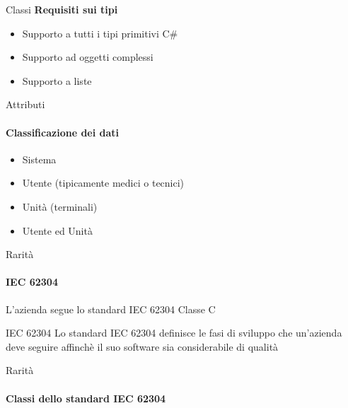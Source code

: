 \documentclass{beamer}
\begin{document}
\begin{darkframes}
\begin{frame}{Classi}
    \textbf{Requisiti sui tipi}
    \begin{itemize}
      \item Supporto a tutti i tipi primitivi C\#
      \item Supporto ad oggetti complessi
      \item Supporto a liste
    \end{itemize}

  \end{frame}

  \begin{frame}{Attributi}
    \framesubtitle{Classificazione dei dati}
    \begin{itemize}
      \item Sistema
      \item Utente (tipicamente medici o tecnici)
      \item Unità (terminali)
      \item Utente ed Unità
    \end{itemize}

  \end{frame}

  \begin{frame}{Rarità}
    \framesubtitle{IEC 62304}

    L'azienda segue lo standard IEC 62304 Classe C

    \begin{block}{IEC 62304}
      Lo standard IEC 62304 definisce le fasi di sviluppo che un'azienda deve seguire affinchè il suo software sia considerabile di qualità
    \end{block}

  \end{frame}

  \begin{frame}{Rarità}
    \framesubtitle{Classi dello standard IEC 62304}


\end{frame}
\end{darkframes}
\end{document}
